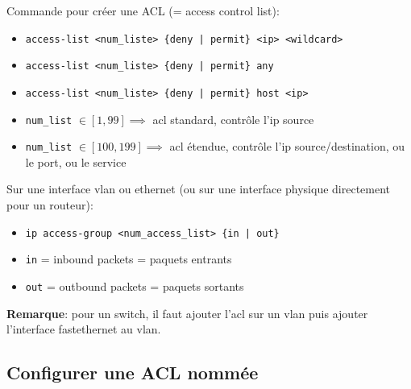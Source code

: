 \documentclass[a4paper]{article}
\begin{document}
Commande pour créer une ACL (= access control list):
\begin{itemize}[label=\textbf{–}]
    \item \texttt{access-list <num\_liste> \{deny | permit\} <ip> <wildcard>}
    \item \texttt{access-list <num\_liste> \{deny | permit\} any}
    \item \texttt{access-list <num\_liste> \{deny | permit\} host <ip>}
\end{itemize}
\begin{itemize}
    \item \texttt{num\_list} $ \in [1,99]  \implies $ acl standard, contrôle l'ip source
    \item \texttt{num\_list} $ \in [100,199] \implies $ acl étendue, contrôle l'ip source/destination, ou le port, ou le service
\end{itemize}
Sur une interface vlan ou ethernet (ou sur une interface physique directement pour un routeur):
\begin{itemize}[label=\textbf{–}]
    \item \texttt{ip access-group <num\_access\_list> \{in | out\}}
\end{itemize}
\begin{itemize}
    \item \texttt{in} = inbound packets = paquets entrants
    \item \texttt{out} = outbound packets = paquets sortants
\end{itemize}
\textbf{Remarque}: pour un switch, il faut ajouter l'acl sur un vlan puis ajouter l'interface fastethernet au vlan.





\subsection{Configurer une ACL nommée}
\end{document}
